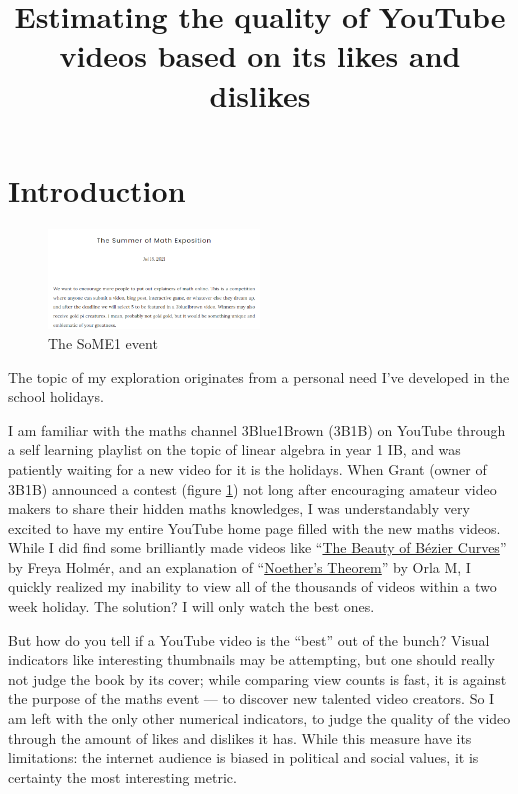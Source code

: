 \documentclass[a4paper,11pt]{article}
\title{Estimating the quality of YouTube videos based on its likes and dislikes}
\author{}
\date{\vspace{-8ex}}
\begin{document}




\maketitle

\section{Introduction}

\begin{figure}
    \centering
    \includegraphics[width=0.5\textwidth]{assets/som1.png}
    \caption{The SoME1 event}
    \label{fig:some1}
\end{figure}

The topic of my exploration originates from a personal need I've developed in the school holidays.

I am familiar with the maths channel 3Blue1Brown (3B1B) on YouTube through a self learning playlist on the topic of linear algebra in year 1 IB, and was patiently waiting for a new video for it is the holidays. When Grant (owner of 3B1B) announced a contest (figure \ref{fig:some1}) not long after encouraging amateur video makers to share their hidden maths knowledges, I was understandably very excited to have my entire YouTube home page filled with the new maths videos. While I did find some brilliantly made videos like ``\href{https://www.youtube.com/watch?v=aVwxzDHniEw}{The Beauty of B\'{e}zier Curves}'' by Freya Holm\'{e}r, and an explanation of ``\href{https://www.youtube.com/watch?v=78wz4KSzUvo}{Noether's Theorem}'' by Orla M, I quickly realized my inability to view all of the thousands of videos within a two week holiday. The solution? I will only watch the best ones.

But how do you tell if a YouTube video is the ``best'' out of the bunch? Visual indicators like interesting thumbnails may be attempting, but one should really not judge the book by its cover; while comparing view counts is fast, it is against the purpose of the maths event --- to discover new talented video creators. So I am left with the only other numerical indicators, to judge the quality of the video through the amount of likes and dislikes it has. While this measure have its limitations: the internet audience is biased in political and social values, it is certainty the most interesting metric.
\end{document}
